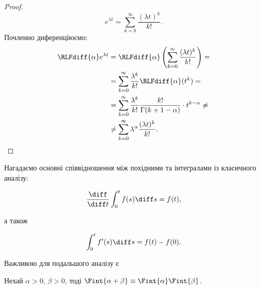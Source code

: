 \begin{proof}
    \begin{equation}
        e^{\lambda t} = \sum_{k = 0}^\infty \frac{(\lambda t)^k}{k!}.
    \end{equation}
    Почленно диференціюємо:
    \begin{equation}
        \begin{aligned} 
            \RLFdiff{\alpha} e^{\lambda t} 
            &= \RLFdiff{\alpha} \left( \sum_{k = 0}^\infty \frac{(\lambda t)^k}{k!} \right) = \\
            &= \sum_{k = 0}^\infty \frac{\lambda^k}{k!} \RLFdiff{\alpha} ( t^k ) = \\
            &= \sum_{k = 0}^\infty \frac{\lambda^k}{k!} \frac{k!}{\Gamma(k + 1 - \alpha)} \cdot t^{k - \alpha} \ne \\
            &\ne \sum_{k = 0}^\infty \lambda^\alpha \frac{(\lambda t)^k}{k!}.
        \end{aligned}
    \end{equation}
\end{proof}

Нагадаємо основні співвідношення між похідними та інтегралами із класичного аналізу:
\begin{th_formula}
    \begin{equation}
        \frac{\diff}{\diff t} \int_0^t f(s) \diff s = f(t),
    \end{equation}
\end{th_formula}
а також
\begin{th_formula}
    \begin{equation}
        \int_0^t f'(s) \diff s = f(t) - f(0).
    \end{equation}
\end{th_formula}

Важливою для подальшого аналізу є
\begin{property}
    Нехай $\alpha > 0$, $\beta > 0$, тоді $\Fint{\alpha + \beta} \equiv \Fint{\alpha} \Fint{\beta}$.
\end{property}

